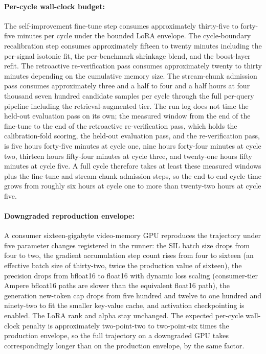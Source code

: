 \paragraph{Per-cycle wall-clock budget:} The self-improvement fine-tune step consumes approximately thirty-five to forty-five minutes per cycle under the bounded LoRA envelope. The cycle-boundary recalibration step consumes approximately fifteen to twenty minutes including the per-signal isotonic fit, the per-benchmark shrinkage blend, and the boost-layer refit. The retroactive re-verification pass consumes approximately twenty to thirty minutes depending on the cumulative memory size. The stream-chunk admission pass consumes approximately three and a half to four and a half hours at four thousand seven hundred candidate samples per cycle through the full per-query pipeline including the retrieval-augmented tier. The run log does not time the held-out evaluation pass on its own; the measured window from the end of the fine-tune to the end of the retroactive re-verification pass, which holds the calibration-fold scoring, the held-out evaluation pass, and the re-verification pass, is five hours forty-five minutes at cycle one, nine hours forty-four minutes at cycle two, thirteen hours fifty-four minutes at cycle three, and twenty-one hours fifty minutes at cycle five. A full cycle therefore takes at least these measured windows plus the fine-tune and stream-chunk admission steps, so the end-to-end cycle time grows from roughly six hours at cycle one to more than twenty-two hours at cycle five.

\paragraph{Downgraded reproduction envelope:} A consumer sixteen-gigabyte video-memory GPU reproduces the trajectory under five parameter changes registered in the runner: the SIL batch size drops from four to two, the gradient accumulation step count rises from four to sixteen (an effective batch size of thirty-two, twice the production value of sixteen), the precision drops from bfloat16 to float16 with dynamic loss scaling (consumer-tier Ampere bfloat16 paths are slower than the equivalent float16 path), the generation new-token cap drops from five hundred and twelve to one hundred and ninety-two to fit the smaller key-value cache, and activation checkpointing is enabled. The LoRA rank and alpha stay unchanged. The expected per-cycle wall-clock penalty is approximately two-point-two to two-point-six times the production envelope, so the full trajectory on a downgraded GPU takes correspondingly longer than on the production envelope, by the same factor.

